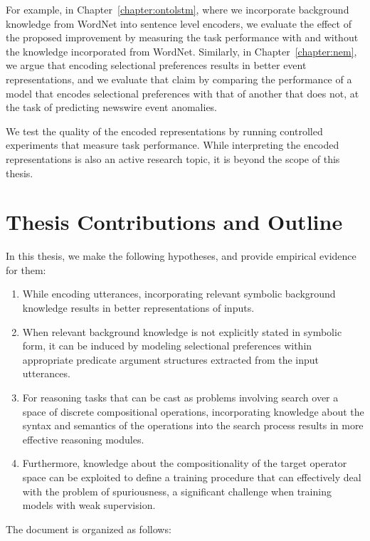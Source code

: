 For example, in Chapter~\ref{chapter:ontolstm}, where we incorporate background knowledge from
WordNet into sentence level encoders, we evaluate the effect of the proposed improvement by
measuring the task performance with and without the knowledge incorporated from WordNet. Similarly,
in Chapter~\ref{chapter:nem}, we argue that encoding selectional preferences results in better event
representations, and we evaluate that claim by comparing the performance of a model that encodes
selectional preferences with that of another that does not, at the task of predicting
newswire event anomalies.

We test the quality of the encoded representations by running controlled experiments that measure
task performance. While interpreting the encoded representations is also an active research
topic, it is beyond the scope of this thesis.

\section{Thesis Contributions and Outline}
In this thesis, we make the following hypotheses, and provide empirical evidence for them:
\begin{enumerate}
	\item While encoding utterances, incorporating relevant symbolic background knowledge results
		in better representations of inputs.
	\item When relevant background knowledge is not explicitly stated in symbolic form,
		it can be induced by modeling selectional preferences within appropriate predicate argument
		structures extracted from the input utterances.
	\item For reasoning tasks that can be cast as problems involving search over a space of
		discrete compositional operations, incorporating knowledge about the syntax and semantics
		of the operations into the search process results in more effective reasoning modules.
	\item Furthermore, knowledge about the compositionality of the target operator space
		can be exploited to define a training procedure that can effectively deal with the
		problem of spuriousness, a significant challenge when training models with weak
		supervision.
\end{enumerate}

The document is organized as follows:


